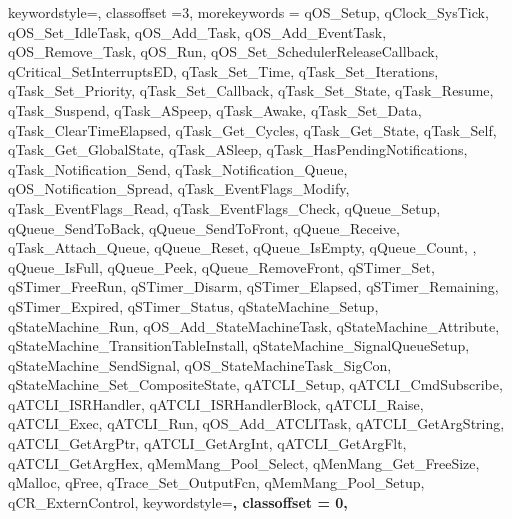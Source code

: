 {    keywordstyle=\color{teal},    
    classoffset =3,
    morekeywords = {qOS_Setup, qClock_SysTick, qOS_Set_IdleTask, qOS_Add_Task, qOS_Add_EventTask, qOS_Remove_Task, qOS_Run, qOS_Set_SchedulerReleaseCallback, qCritical_SetInterruptsED, qTask_Set_Time, qTask_Set_Iterations, qTask_Set_Priority, qTask_Set_Callback, qTask_Set_State, qTask_Resume, qTask_Suspend, qTask_ASpeep, qTask_Awake, qTask_Set_Data, qTask_ClearTimeElapsed, qTask_Get_Cycles, qTask_Get_State, qTask_Self, qTask_Get_GlobalState, qTask_ASleep, qTask_HasPendingNotifications, qTask_Notification_Send, qTask_Notification_Queue, qOS_Notification_Spread, qTask_EventFlags_Modify, qTask_EventFlags_Read, qTask_EventFlags_Check, qQueue_Setup, qQueue_SendToBack, qQueue_SendToFront, qQueue_Receive, qTask_Attach_Queue, qQueue_Reset, qQueue_IsEmpty, qQueue_Count, , qQueue_IsFull, qQueue_Peek, qQueue_RemoveFront, qSTimer_Set, qSTimer_FreeRun, qSTimer_Disarm, qSTimer_Elapsed, qSTimer_Remaining, qSTimer_Expired, qSTimer_Status, qStateMachine_Setup, qStateMachine_Run, qOS_Add_StateMachineTask, qStateMachine_Attribute, qStateMachine_TransitionTableInstall, qStateMachine_SignalQueueSetup, qStateMachine_SendSignal, qOS_StateMachineTask_SigCon, qStateMachine_Set_CompositeState, qATCLI_Setup, qATCLI_CmdSubscribe, qATCLI_ISRHandler, qATCLI_ISRHandlerBlock, qATCLI_Raise, qATCLI_Exec, qATCLI_Run, qOS_Add_ATCLITask, qATCLI_GetArgString, qATCLI_GetArgPtr, qATCLI_GetArgInt, qATCLI_GetArgFlt, qATCLI_GetArgHex, qMemMang_Pool_Select, qMenMang_Get_FreeSize, qMalloc, qFree, qTrace_Set_OutputFcn, qMemMang_Pool_Setup, qCR_ExternControl},
    keywordstyle=\bfseries,
    classoffset = 0,
}